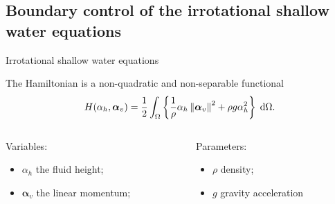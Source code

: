 \documentclass[aspectratio=169]{ISAE-Beamer}
\newcommand*{\norm}[1]{\ensuremath{\left\|#1\right\|}}
\newcommand{\energy}[1]{\frac{1}{2} \int_{\Omega} \left\{ #1 \right\} \d\Omega}
\begin{document}
\subsection{Boundary control of the irrotational shallow water equations}

\begin{frame}{Irrotational shallow water equations}
	
The Hamiltonian is a non-quadratic and non-separable functional
\begin{equation*}
		H(\alpha_h, \bm{\alpha}_v) = \energy{\frac{1}{\rho} \alpha_h \norm{\bm{\alpha}_v}^2 + \rho g \alpha_h^2}.
\end{equation*}


\begin{columns}
	
	\begin{column}{.45\textwidth}
		Variables: 
		\begin{itemize}
			\item $\alpha_h$ the fluid height;
			\item $\bm{\alpha}_v$ the linear momentum;
		\end{itemize}
	\end{column}
	
	\begin{column}{.45\textwidth}
		Parameters:
		\begin{itemize}
			\item $\rho$ density;
			\item $g$ gravity acceleration
		\end{itemize}
	\end{column}
	
\end{columns}

\vspace{.5cm}
	

\end{frame}
\end{document}
